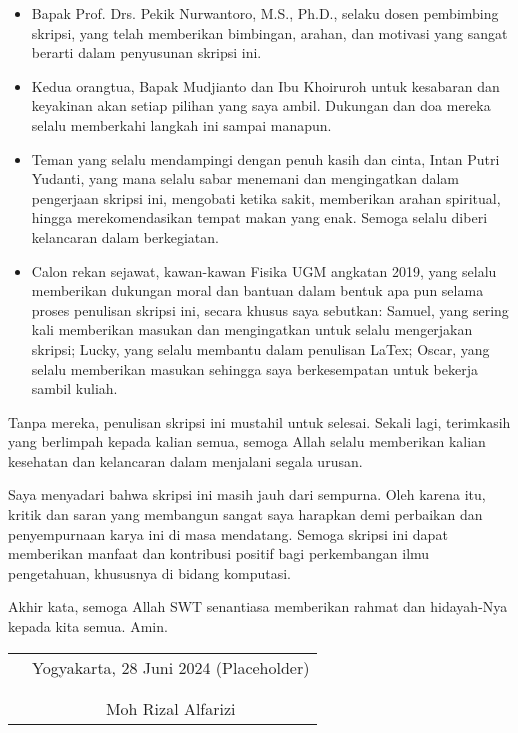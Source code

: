 \documentclass{skripsiactugm}
\begin{document}
\begin{itemize}
	\item Bapak Prof. Drs. Pekik Nurwantoro, M.S., Ph.D., selaku dosen pembimbing skripsi, yang telah memberikan bimbingan, arahan, dan motivasi yang sangat berarti dalam penyusunan skripsi ini.
	\item Kedua orangtua, Bapak Mudjianto dan Ibu Khoiruroh untuk kesabaran dan keyakinan akan setiap pilihan yang saya ambil.
	      Dukungan dan doa mereka selalu memberkahi langkah ini sampai manapun.
	\item Teman yang selalu mendampingi dengan penuh kasih dan cinta, Intan Putri Yudanti, yang mana selalu sabar menemani dan mengingatkan dalam pengerjaan skripsi ini, mengobati ketika sakit, memberikan arahan spiritual, hingga merekomendasikan tempat makan yang enak. Semoga selalu diberi kelancaran dalam berkegiatan.
	\item Calon rekan sejawat, kawan-kawan Fisika UGM angkatan 2019, yang selalu memberikan dukungan moral dan bantuan dalam bentuk apa pun selama proses penulisan skripsi ini, secara khusus saya sebutkan: Samuel, yang sering kali memberikan masukan dan mengingatkan untuk selalu mengerjakan skripsi; Lucky, yang selalu membantu dalam penulisan LaTex; Oscar, yang selalu memberikan masukan sehingga saya berkesempatan untuk bekerja sambil kuliah.
\end{itemize}

\noindent
Tanpa mereka, penulisan skripsi ini mustahil untuk selesai. Sekali lagi, terimkasih yang berlimpah kepada kalian semua, semoga Allah selalu memberikan kalian kesehatan dan kelancaran dalam menjalani segala urusan.

Saya menyadari bahwa skripsi ini masih jauh dari sempurna. Oleh karena itu, kritik dan saran yang membangun sangat saya harapkan demi perbaikan dan penyempurnaan karya ini di masa mendatang. Semoga skripsi ini dapat memberikan manfaat dan kontribusi positif bagi perkembangan ilmu pengetahuan, khususnya di bidang komputasi.

Akhir kata, semoga Allah SWT senantiasa memberikan rahmat dan hidayah-Nya kepada kita semua. Amin.

\vspace{0.8cm}

\begin{tabular}{p{7cm}c}
	 & Yogyakarta, 28 Juni 2024 (Placeholder) \\
	 &                                        \\
	 &                                        \\
	 & Moh Rizal Alfarizi
\end{tabular}
\end{document}
